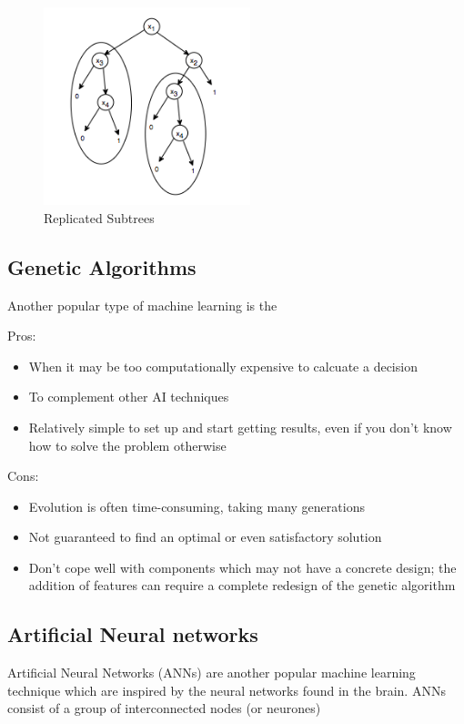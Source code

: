 \documentclass[a4paper,oneside]{report}
\begin{document}
\begin{figure}[h!]
	\centering
		\includegraphics[width=60mm]{sources/images/ReplicatedSubtrees}
    	\caption{Replicated Subtrees}
\end{figure}

\subsection{Genetic Algorithms}

Another popular type of machine learning is the 

Pros:
\begin{itemize}
	\item When it may be too computationally expensive to calcuate a decision
	\item To complement other AI techniques
	\item Relatively simple to set up and start getting results, even if you don't know how to solve the problem otherwise
\end{itemize}

\noindent Cons:
\begin{itemize} 
	\item Evolution is often time-consuming, taking many generations
	\item Not guaranteed to find an optimal or even satisfactory solution
	\item Don't cope well with components which may not have a concrete design; the addition of features can require a complete redesign of the genetic algorithm
\end{itemize}

\subsection{Artificial Neural networks}

Artificial Neural Networks (ANNs) are another popular machine learning technique which are inspired by the neural networks found in the brain. ANNs consist of a group of interconnected nodes (or neurones)
\end{document}
